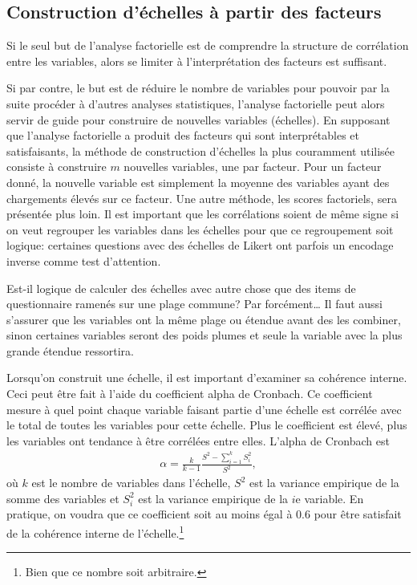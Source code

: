 \documentclass[
  11pt,
  letterpaper,
]{scrbook}
\theoremstyle{definition}
\theoremstyle{remark}
\begin{document}
\hypertarget{construction-duxe9chelles-uxe0-partir-des-facteurs}{%
\subsection{Construction d'échelles à partir des
facteurs}\label{construction-duxe9chelles-uxe0-partir-des-facteurs}}

Si le seul but de l'analyse factorielle est de comprendre la structure
de corrélation entre les variables, alors se limiter à l'interprétation
des facteurs est suffisant.

Si par contre, le but est de réduire le nombre de variables pour pouvoir
par la suite procéder à d'autres analyses statistiques, l'analyse
factorielle peut alors servir de guide pour construire de nouvelles
variables (échelles). En supposant que l'analyse factorielle a produit
des facteurs qui sont interprétables et satisfaisants, la méthode de
construction d'échelles la plus couramment utilisée consiste à
construire \(m\) nouvelles variables, une par facteur. Pour un facteur
donné, la nouvelle variable est simplement la moyenne des variables
ayant des chargements élevés sur ce facteur. Une autre méthode, les
scores factoriels, sera présentée plus loin. Il est important que les
corrélations soient de même signe si on veut regrouper les variables
dans les échelles pour que ce regroupement soit logique: certaines
questions avec des échelles de Likert ont parfois un encodage inverse
comme test d'attention.

Est-il logique de calculer des échelles avec autre chose que des items
de questionnaire ramenés sur une plage commune? Par forcément\ldots{} Il
faut aussi s'assurer que les variables ont la même plage ou étendue
avant des les combiner, sinon certaines variables seront des poids
plumes et seule la variable avec la plus grande étendue ressortira.

Lorsqu'on construit une échelle, il est important d'examiner sa
cohérence interne. Ceci peut être fait à l'aide du coefficient alpha de
Cronbach. Ce coefficient mesure à quel point chaque variable faisant
partie d'une échelle est corrélée avec le total de toutes les variables
pour cette échelle. Plus le coefficient est élevé, plus les variables
ont tendance à être corrélées entre elles. L'alpha de Cronbach est
\begin{align*}
\alpha=\frac{k}{k-1} \frac{S^2-\sum_{i=1}^k S_i^2}{S^2}, 
\end{align*} où \(k\) est le nombre de variables dans l'échelle, \(S^2\)
est la variance empirique de la somme des variables et \(S_i^2\) est la
variance empirique de la \(i\)e variable. En pratique, on voudra que ce
coefficient soit au moins égal à 0.6 pour être satisfait de la cohérence
interne de l'échelle.\footnote{Bien que ce nombre soit arbitraire.}
\end{document}
